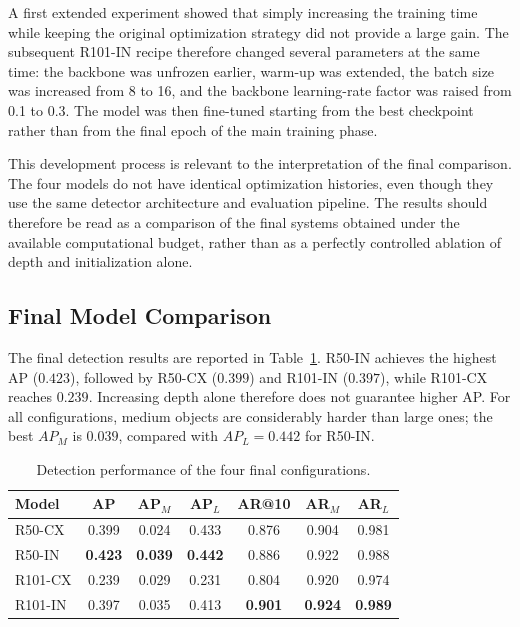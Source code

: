 \documentclass[11pt,a4paper]{article}
\begin{document}
A first extended experiment showed that simply increasing the training time
while keeping the original optimization strategy did not provide a large
gain. The subsequent R101-IN recipe therefore changed several parameters at
the same time: the backbone was unfrozen earlier, warm-up was extended, the
batch size was increased from 8 to 16, and the backbone learning-rate factor
was raised from 0.1 to 0.3. The model was then fine-tuned starting from the
best checkpoint rather than from the final epoch of the main training phase.

This development process is relevant to the interpretation of the final
comparison. The four models do not have identical optimization histories,
even though they use the same detector architecture and evaluation pipeline.
The results should therefore be read as a comparison of the final systems
obtained under the available computational budget, rather than as a perfectly
controlled ablation of depth and initialization alone.


\subsection{Final Model Comparison}
\label{subsec:final_model_comparison}

The final detection results are reported in Table~\ref{tab:final_model_comparison}. R50-IN achieves the highest AP ($0.423$), followed by R50-CX ($0.399$) and R101-IN ($0.397$), while R101-CX reaches $0.239$. Increasing depth alone therefore does not guarantee higher AP. For all configurations, medium objects are considerably harder than large ones; the best $AP_M$ is $0.039$, compared with $AP_L=0.442$ for R50-IN.

\begin{table}[H]
    \centering
    \caption{Detection performance of the four final configurations.}
    \label{tab:final_model_comparison}
    \begin{tabular}{lcccccc}
        \hline
        \textbf{Model} & \textbf{AP} & \textbf{AP$_M$} & \textbf{AP$_L$} & \textbf{AR@10} & \textbf{AR$_M$} & \textbf{AR$_L$} \\
        \hline
        R50-CX & 0.399 & 0.024 & 0.433 & 0.876 & 0.904 & 0.981 \\
        R50-IN & \textbf{0.423} & \textbf{0.039} & \textbf{0.442} & 0.886 & 0.922 & 0.988 \\
        R101-CX & 0.239 & 0.029 & 0.231 & 0.804 & 0.920 & 0.974 \\
        R101-IN & 0.397 & 0.035 & 0.413 & \textbf{0.901} & \textbf{0.924} & \textbf{0.989} \\
        \hline
    \end{tabular}
\end{table}
\end{document}
